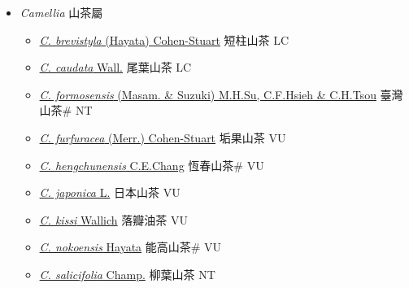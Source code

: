 
  \begin{itemize}
 \item[] \textit{Camellia} 山茶屬
                    
  \begin{itemize}
        \item[] \href{http://www.theplantlist.org/tpl1.1/search?q=Camellia+brevistyla}{\textit{C. brevistyla} (Hayata) Cohen-Stuart}   短柱山茶 LC
        \item[] \href{http://www.theplantlist.org/tpl1.1/search?q=Camellia+caudata}{\textit{C. caudata} Wall.}   尾葉山茶 LC
        \item[] \href{http://www.theplantlist.org/tpl1.1/search?q=Camellia+formosensis}{\textit{C. formosensis} (Masam. \& Suzuki) M.H.Su, C.F.Hsieh \& C.H.Tsou}     臺灣山茶\# NT
        \item[] \href{http://www.theplantlist.org/tpl1.1/search?q=Camellia+furfuracea}{\textit{C. furfuracea} (Merr.) Cohen-Stuart}   垢果山茶 VU
        \item[] \href{http://www.theplantlist.org/tpl1.1/search?q=Camellia+hengchunensis}{\textit{C. hengchunensis} C.E.Chang}   恆春山茶\# VU
        \item[] \href{http://www.theplantlist.org/tpl1.1/search?q=Camellia+japonica}{\textit{C. japonica} L.}   日本山茶 VU
        \item[] \href{http://www.theplantlist.org/tpl1.1/search?q=Camellia+kissi}{\textit{C. kissi} Wallich}   落瓣油茶 VU
        \item[] \href{http://www.theplantlist.org/tpl1.1/search?q=Camellia+nokoensis}{\textit{C. nokoensis} Hayata}   能高山茶\# VU
        \item[] \href{http://www.theplantlist.org/tpl1.1/search?q=Camellia+salicifolia}{\textit{C. salicifolia} Champ.}   柳葉山茶 NT

\end{itemize}
\end{itemize}
